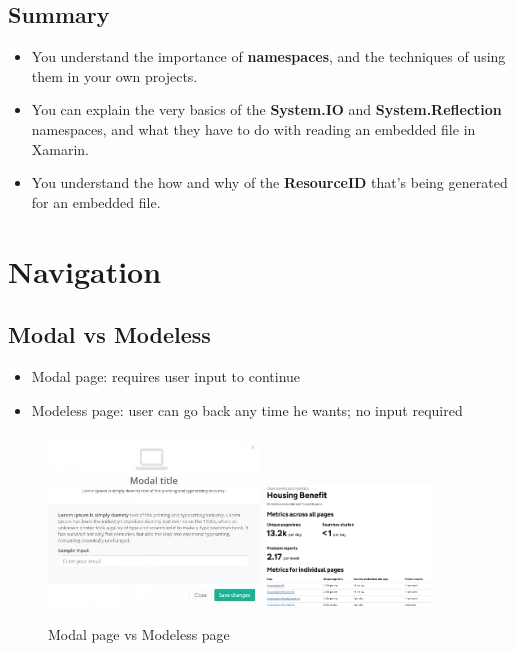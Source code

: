 \documentclass{article}
\newcommand{\bold}[1]{\textbf{#1}}
\begin{document}
\subsection{Summary}

\begin{itemize}
    \item You understand the importance of \bold{namespaces}, and the techniques of using them in your own projects.
    \item You can explain the very basics of the \bold{System.IO} and \bold{System.Reflection} namespaces, and what they have to do with reading an embedded file in Xamarin.
    \item You understand the how and why of the \bold{ResourceID} that’s being generated for an embedded file.
\end{itemize}

\section{Navigation}

\subsection{Modal vs Modeless}

\begin{itemize}
    \item Modal page: requires user input to continue
    \item Modeless page: user can go back any time he wants; no input required
\end{itemize}

\begin{figure}[H]
    \centering
    \includegraphics[width=0.5\textwidth]{modal-page.png}
    \includegraphics[width=0.4\textwidth]{modeless-page.png}
    \caption{Modal page vs Modeless page}
\end{figure}
\end{document}
